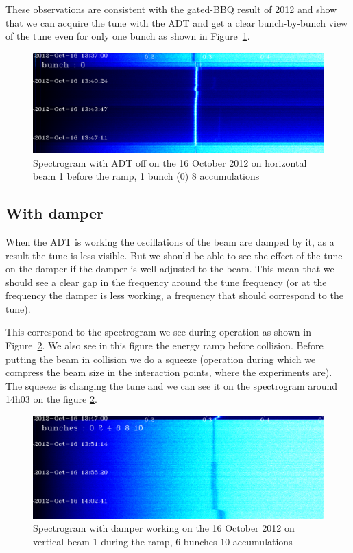 These observations are consistent with the gated-\gls{BBQ} result of 2012 \cite{Valuch12} and show that we can acquire the tune with the \gls{ADT} and get a clear bunch-by-bunch view of the tune even for only one bunch as shown in Figure~\ref{fig:bunch_0_adt_off}.

\begin{figure}[H]
\caption{Spectrogram with ADT off on the 16 October 2012 on horizontal beam 1 before the ramp, 1 bunch (0) 8 accumulations}
\label{fig:bunch_0_adt_off}
\centering
\includegraphics[scale=0.3]{md-121016-hb1-m1-bunch000001-8acc-1337-1349.pdf}
\end{figure}

\subsection{With damper}

When the \gls{ADT} is working the oscillations of the beam are damped by it, as a result the tune is less visible. But we should be able to see the effect of the tune on the damper if the damper is well adjusted to the beam. This mean that we should see a clear gap in the frequency around the tune frequency (or at the frequency the damper is less working, a frequency that should correspond to the tune).

This correspond to the spectrogram we see during operation as shown in
Figure~\ref{fig:ramp}. We also see in this figure the energy ramp
before collision. Before putting the beam in collision we do a squeeze
(operation during which we compress the beam size in the interaction
points, where the experiments are). The squeeze is changing the tune
and we can see it on the spectrogram around 14h03 on the figure
\ref{fig:ramp}.

\begin{figure}[H]
\caption{Spectrogram with damper working on the 16 October 2012 on vertical beam 1 during the ramp, 6 bunches 10 accumulations}
\centering
\label{fig:ramp}
\includegraphics[scale=0.3]{md-121016-vb1-m1-6bunches-10acc-1347-1405-ramp.pdf}
\end{figure}

